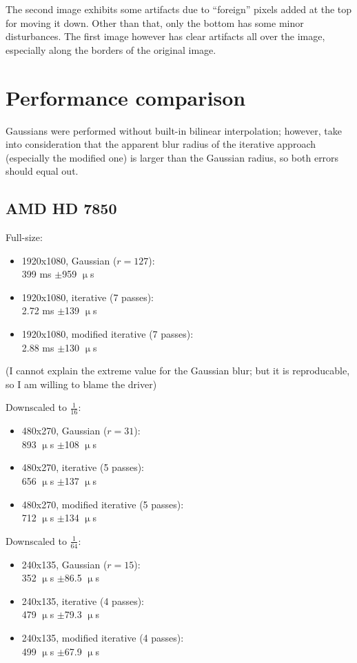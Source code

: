\documentclass[english,fleqn,10pt,twocolumn]{article}
\begin{document}
The second image exhibits some artifacts due to “foreign” pixels added at the top for moving it down. Other than that, only the bottom has some minor disturbances. The first image however has
clear artifacts all over the image, especially along the borders of the original image.


\section{Performance comparison}

Gaussians were performed without built-in bilinear interpolation; however, take into consideration that the apparent blur radius of the iterative approach (especially the modified one) is larger
than the Gaussian radius, so both errors should equal out.

\subsection{AMD HD 7850}

Full-size:
\begin{itemize}
    \item 1920x1080, Gaussian ($r = 127$): \\
        399 ms $\pm$959 $\upmu$s
    \item 1920x1080, iterative (7 passes): \\
        2.72 ms $\pm$139 $\upmu$s
    \item 1920x1080, modified iterative (7 passes): \\
        2.88 ms $\pm$130 $\upmu$s
\end{itemize}

(I cannot explain the extreme value for the Gaussian blur; but it is reproducable, so I am willing to blame the driver)

Downscaled to $\frac 1{16}$:
\begin{itemize}
    \item 480x270, Gaussian ($r = 31$): \\
        893 $\upmu$s $\pm$108 $\upmu$s
    \item 480x270, iterative (5 passes): \\
        656 $\upmu$s $\pm$137 $\upmu$s
    \item 480x270, modified iterative (5 passes): \\
        712 $\upmu$s $\pm$134 $\upmu$s
\end{itemize}

Downscaled to $\frac 1{64}$:
\begin{itemize}
    \item 240x135, Gaussian ($r = 15$): \\
        352 $\upmu$s $\pm$86.5 $\upmu$s
    \item 240x135, iterative (4 passes): \\
        479 $\upmu$s $\pm$79.3 $\upmu$s
    \item 240x135, modified iterative (4 passes): \\
        499 $\upmu$s $\pm$67.9 $\upmu$s
\end{itemize}
\end{document}
